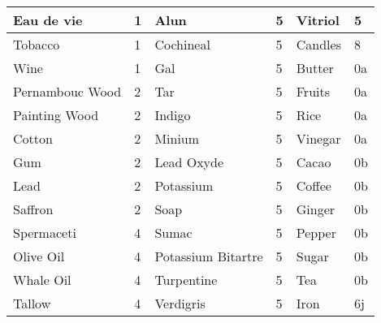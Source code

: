 \begin{center}
\begin{tabular}{ | l | l | l | l | l | l | }
\hline
	Eau de vie & 1 & Alun & 5 & Vitriol & 5 \\ \hline
	Tobacco & 1 & Cochineal & 5 & Candles & 8 \\ \hline
	Wine & 1 & Gal & 5 & Butter & 0a \\ \hline
	Pernambouc Wood & 2 & Tar & 5 & Fruits & 0a \\ \hline
	Painting Wood & 2 & Indigo & 5 & Rice & 0a \\ \hline
	Cotton & 2 & Minium  & 5 & Vinegar & 0a \\ \hline
	Gum & 2 & Lead Oxyde & 5 & Cacao & 0b \\ \hline
	Lead & 2 & Potassium & 5 & Coffee & 0b \\ \hline
	Saffron & 2 & Soap & 5 & Ginger & 0b \\ \hline
	Spermaceti & 4 & Sumac & 5 & Pepper & 0b \\ \hline
	Olive Oil & 4 & Potassium Bitartre & 5 & Sugar & 0b \\ \hline
	Whale Oil & 4 & Turpentine & 5 & Tea & 0b \\ \hline
	Tallow & 4 & Verdigris & 5 & Iron & 6j \\ \hline
\end{tabular}
\end{center}